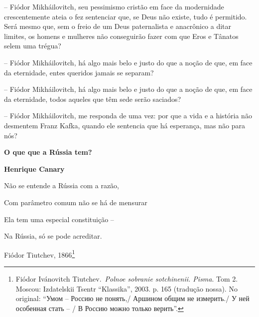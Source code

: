 -- Fiódor Mikháilovitch, seu pessimismo cristão em face da modernidade
crescentemente ateia o fez sentenciar que, se Deus não existe, tudo é
permitido. Será mesmo que, sem o freio de um Deus paternalista e
anacrônico a ditar limites, os homens e mulheres não conseguirão fazer
com que Eros e Tânatos selem uma trégua?

-- Fiódor Mikháilovitch, há algo mais belo e justo do que a noção de
que, em face da eternidade, entes queridos jamais se separam?

-- Fiódor Mikháilovitch, há algo mais belo e justo do que a noção de
que, em face da eternidade, todos aqueles que têm sede serão saciados?

-- Fiódor Mikháilovitch, me responda de uma vez: por que a vida e a
história não desmentem Franz Kafka, quando ele sentencia que há
esperança, mas não para nós?

\textbf{O que que a Rússia tem?}

\textbf{Henrique Canary}

Não se entende a Rússia com a razão,

Com parâmetro comum não se há de mensurar

Ela tem uma especial constituição --

Na Rússia, só se pode acreditar.

Fiódor Tiutchev, 1866\footnote{Fiódor Ivánovitch Tiutchev.~\emph{Polnoe
  sobranie sotchinenii. Pisma}. Tom 2. Moscou: Izdatelskii Tsentr
  ``Klassika'', 2003. p. 165 (tradução nossa). No original: ``Умом --
  Россию не понять,/ Аршином общим не измерить./ У ней особенная стать
  -- / В Россию можно только верить''.}

